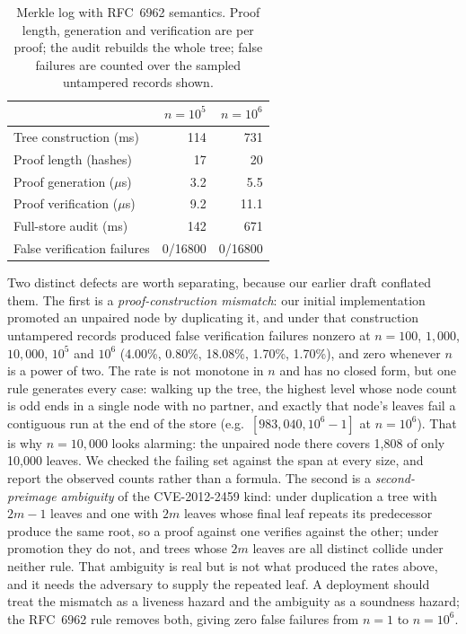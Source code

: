 \documentclass[conference]{IEEEtran}
\begin{document}
\begin{table}[t]
\caption{Merkle log with RFC~6962 semantics. Proof length, generation and verification
are per proof; the audit rebuilds the whole tree; false failures are counted over the
sampled untampered records shown.}
\label{tab:scale}
\centering
\scriptsize
\begin{tabular}{lrr}
\toprule
 & $n=10^5$ & $n=10^6$ \\
\midrule
Tree construction (ms) & 114 & 731 \\
Proof length (hashes) & 17 & 20 \\
Proof generation ($\mu$s) & 3.2 & 5.5 \\
Proof verification ($\mu$s) & 9.2 & 11.1 \\
Full-store audit (ms) & 142 & 671 \\
False verification failures & 0/16800 & 0/16800 \\
\bottomrule
\end{tabular}
\end{table}

Two distinct defects are worth separating, because our earlier draft conflated them. The first is a
\emph{proof-construction mismatch}: our initial implementation promoted an unpaired node by duplicating it,
and under that construction untampered records produced false verification failures nonzero at $n=100$, $1{,}000$, $10{,}000$, $10^5$ and $10^6$ (4.00\%, 0.80\%, 18.08\%, 1.70\%, 1.70\%), and zero whenever $n$ is a power of two. The rate is not monotone in $n$ and has
no closed form, but one rule generates every case: walking up the tree, the highest level whose node count is
odd ends in a single node with no partner, and exactly that node's leaves fail a contiguous run at the end
of the store (e.g.\ $[983{,}040, 10^6-1]$ at $n=10^6$). That is why $n=10{,}000$ looks alarming: the unpaired node there
covers 1{,}808 of only 10{,}000 leaves. We checked the failing set against the span at every size, and report
the observed counts rather than a formula. The second is a \emph{second-preimage ambiguity} of the
CVE-2012-2459 kind: under duplication a tree with $2m-1$ leaves and one with $2m$ leaves whose final leaf
repeats its predecessor produce the same root, so a proof against one verifies against the other; under
promotion they do not, and trees whose $2m$ leaves are all distinct collide under neither rule. That ambiguity
is real but is not what produced the rates above, and it needs the adversary to supply the repeated leaf. A
deployment should treat the mismatch as a liveness hazard and the ambiguity as a soundness hazard; the RFC~6962
rule removes both, giving zero false failures from $n=1$ to $n=10^6$.
\end{document}
